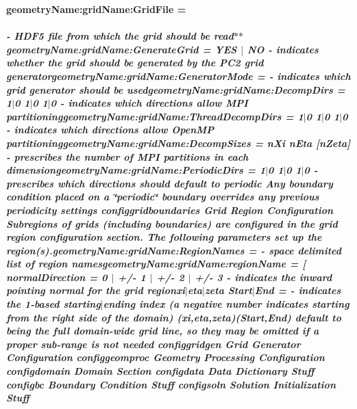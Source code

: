 \begin{DoxyItemize}
\item {\bfseries geometry\+Name\+:grid\+Name\+:Grid\+File = \subparagraph*{-\/ H\+D\+F5 file from which the grid should be read$\ast$$\ast$geometry\+Name\+:grid\+Name\+:Generate\+Grid = Y\+ES $\vert$ NO -\/ indicates whether the grid should be generated by the P\+C2 grid generator{\bfseries geometry\+Name\+:grid\+Name\+:Generator\+Mode} =  -\/ indicates which grid generator should be used{\bfseries geometry\+Name\+:grid\+Name\+:Decomp\+Dirs} = 1$\vert$0 1$\vert$0 1$\vert$0 -\/ indicates which directions allow M\+PI partitioning{\bfseries geometry\+Name\+:grid\+Name\+:Thread\+Decomp\+Dirs} = 1$\vert$0 1$\vert$0 1$\vert$0 -\/ indicates which directions allow Open\+MP partitioning{\bfseries geometry\+Name\+:grid\+Name\+:Decomp\+Sizes} = n\+Xi n\+Eta \mbox{[}n\+Zeta\mbox{]} -\/ prescribes the number of M\+PI partitions in each dimension{\bfseries geometry\+Name\+:grid\+Name\+:Periodic\+Dirs} = 1$\vert$0 1$\vert$0 1$\vert$0 -\/ prescribes which directions should {\itshape default} to periodic  Any boundary condition placed on a \char`\"{}periodic\char`\"{} boundary overrides any previous periodicity settings  configgridboundaries Grid Region Configuration Subregions of grids (including boundaries) are configured in the {\itshape grid region} configuration section. The following parameters set up the region(s).{\bfseries geometry\+Name\+:grid\+Name\+:Region\+Names} =    -\/ space delimited list of region names{\bfseries geometry\+Name\+:grid\+Name\+:region\+Name} =  \mbox{[}      {\bfseries normal\+Direction} = 0 $\vert$ +/-\/ 1 $\vert$ +/-\/ 2 $\vert$ +/-\/ 3 -\/ indicates the {\itshape inward pointing} normal for the grid region{\bfseries xi$\vert$eta$\vert$zeta Start$\vert$\+End} =  -\/ indicates the {\itshape 1-\/based} starting$\vert$ending index (a negative number indicates starting from the {\itshape right} side of the domain)  (xi,eta,zeta)(Start,End) default to being the full domain-\/wide grid line, so they may be omitted if a proper sub-\/range is not needed  configgridgen Grid Generator Configuration  configgeomproc Geometry Processing Configuration  configdomain Domain Section  configdata Data Dictionary Stuff  configbc Boundary Condition Stuff  configsoln Solution Initialization Stuff }}
\end{DoxyItemize}

{\bfseries }